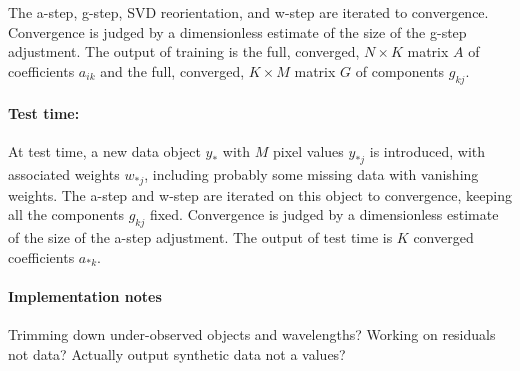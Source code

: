\documentclass{article}
\begin{document}
The a-step, g-step, SVD reorientation, and w-step are iterated to convergence.
Convergence is judged by a dimensionless estimate of the size of the g-step adjustment.
The output of training is the full, converged, $N\times K$ matrix $A$ of coefficients $a_{ik}$ and the full, converged, $K\times M$ matrix $G$ of components $g_{kj}$.

\paragraph{Test time:}
At test time, a new data object $y_\ast$ with $M$ pixel values $y_{\ast j}$ is introduced, with associated weights $w_{\ast j}$, including probably some missing data with vanishing weights.
The a-step and w-step are iterated on this object to convergence, keeping all the components $g_{kj}$ fixed.
Convergence is judged by a dimensionless estimate of the size of the a-step adjustment.
The output of test time is $K$ converged coefficients $a_{\ast k}$.

\paragraph{Implementation notes}
Trimming down under-observed objects and wavelengths?
Working on residuals not data?
Actually output synthetic data not a values?
\end{document}
